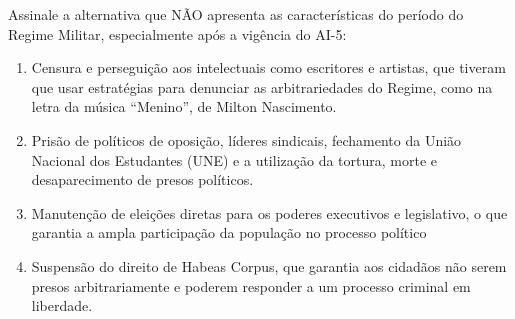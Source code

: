 Assinale a alternativa que NÃO apresenta as características do período do Regime Militar, especialmente após a vigência do AI-5:
\begin{enumerate}
\item Censura e perseguição aos intelectuais como escritores e artistas, que tiveram que usar estratégias para
      denunciar as arbitrariedades do Regime, como na letra da música “Menino”, de Milton Nascimento.
\item Prisão de políticos de oposição, líderes sindicais, fechamento da União Nacional dos Estudantes (UNE) e
      a utilização da tortura, morte e desaparecimento de presos políticos.
\item Manutenção de eleições diretas para os poderes executivos e legislativo, o que garantia a ampla
      participação da população no processo político
\item Suspensão do direito de Habeas Corpus, que garantia aos cidadãos não serem presos arbitrariamente e
      poderem responder a um processo criminal em liberdade.
\end{enumerate}
